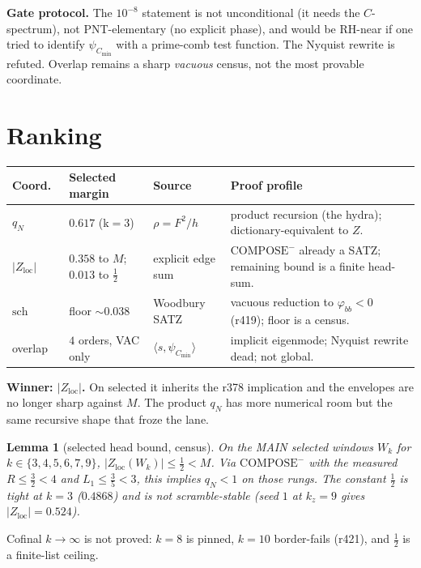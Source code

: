 \documentclass[11pt]{article}
\newtheorem{lemma}{Lemma}
\theoremstyle{remark}
\newcommand{\phibb}{\varphi_{bb}}
\newcommand{\Zloc}{Z_{\mathrm{loc}}}
\newcommand{\Cmin}{C_{\min}}
\begin{document}
\noindent
\textbf{Gate protocol.}
The $10^{-8}$ statement is not unconditional
(it needs the $C$-spectrum), not
PNT-elementary (no explicit phase), and would
be RH-near if one tried to identify
$\psi_{\Cmin}$ with a prime-comb test function.
The Nyquist rewrite is refuted.
Overlap remains a sharp \emph{vacuous} census,
not the most provable coordinate.

\section{Ranking}\label{sec:rank}

\begin{center}
\small
\begin{tabular}{@{}lllp{5.8cm}@{}}
\toprule
Coord.\ & Selected margin & Source & Proof profile \\
\midrule
$q_N$ & $0.617$ (k$=3$) & $\rho=F^2/h$ & product recursion
  (the hydra); dictionary-equivalent to $Z$. \\
$\lvert\Zloc\rvert$ & $0.358$ to $M$;
  $0.013$ to $\tfrac12$ & explicit edge sum &
  $\mathrm{COMPOSE}^{-}$ already a SATZ;
  remaining bound is a finite head-sum. \\
$\mathrm{sch}$ & floor $\sim 0.038$ & Woodbury SATZ &
  vacuous reduction to $\phibb<0$ (r419);
  floor is a census. \\
overlap & $4$ orders, VAC only &
  $\langle s,\psi_{\Cmin}\rangle$ &
  implicit eigenmode; Nyquist rewrite dead;
  not global. \\
\bottomrule
\end{tabular}
\end{center}

\noindent
\textbf{Winner: $\lvert\Zloc\rvert$.}
On selected it inherits the r378 implication
and the envelopes are no longer sharp against $M$.
The product $q_N$ has more numerical room but
the same recursive shape that froze the lane.

\begin{lemma}[selected head bound, census]\label{lem:z0}
On the MAIN selected windows $W_k$ for
$k\in\{3,4,5,6,7,9\}$,
$\lvert\Zloc(W_k)\rvert\le\tfrac12<M$.
Via $\mathrm{COMPOSE}^{-}$ with the measured
$R\le\tfrac32<4$ and $L_1\le\tfrac35<3$, this
implies $q_N<1$ on those rungs.
The constant $\tfrac12$ is tight at $k=3$
($0.4868$) and is \emph{not} scramble-stable
(seed $1$ at $k_z=9$ gives $\lvert\Zloc\rvert=0.524$).
\end{lemma}

Cofinal $k\to\infty$ is not proved:
$k=8$ is pinned, $k=10$ border-fails (r421),
and $\tfrac12$ is a finite-list ceiling.
\end{document}
